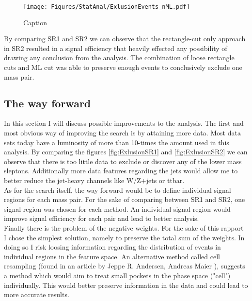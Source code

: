 \documentclass{article}
\begin{document}
\begin{figure}
    \centering
    \texttt{[image: Figures/StatAnal/ExlusionEvents\_nML.pdf]}
    \caption{Caption}
    \label{fig:my_label}
\end{figure}
By comparing SR1 and SR2 we can observe that the rectangle-cut only approach in SR2 resulted in a signal efficiency that heavily effected any possibility of drawing any conclusion from the analysis. The combination of loose rectangle cuts and ML cut was able to preserve enough events to conclusively exclude one mass pair. 
\subsection{The way forward}
In this section I will discuss possible improvements to the analysis. The first and most obvious way of improving the search is by attaining more data. Most data sets today have a luminosity of more than 10-times the amount used in this analysis. By comparing the figures \ref{fig:ExlusionSR1} and \ref{fig:ExlusionSR2} we can observe that there is too little data to exclude or discover any of the lower mass sleptons. Additionally more data features regarding the jets would allow me to better reduce the jet-heavy channels like W/Z+jets or ttbar. 
\\
As for the search itself, the way forward would be to define individual signal regions for each mass pair. For the sake of comparing between SR1 and SR2, one signal region was chosen for each method. An individual signal region would improve signal efficiency for each pair and lead to better analysis. 
\\
Finally there is the problem of the negative weights. For the sake of this rapport I chose the simplest solution, namely to preserve the total sum of the weights. In doing so I risk loosing information regarding the distribution of events in individual regions in the feature space. An alternative method called cell resampling (found in an article by Jeppe R. Andersen, Andreas Maier \cite{cell}), suggests a method which would aim to treat small pockets in the phase space ("cell") individually. This would better preserve information in the data and could lead to more accurate results.
\end{document}
